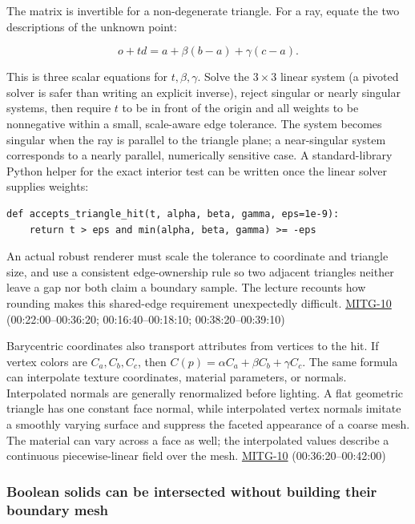 The matrix is invertible for a non-degenerate triangle. For a ray, equate the two descriptions of the unknown point:

\[
o+td=a+\beta(b-a)+\gamma(c-a).
\]

This is three scalar equations for \(t,\beta,\gamma\). Solve the \(3\times3\) linear system (a pivoted solver is safer than writing an explicit inverse), reject singular or nearly singular systems, then require \(t\) to be in front of the origin and all weights to be nonnegative within a small, scale-aware edge tolerance. The system becomes singular when the ray is parallel to the triangle plane; a near-singular system corresponds to a nearly parallel, numerically sensitive case. A standard-library Python helper for the exact interior test can be written once the linear solver supplies weights:

\begin{verbatim}
def accepts_triangle_hit(t, alpha, beta, gamma, eps=1e-9):
    return t > eps and min(alpha, beta, gamma) >= -eps
\end{verbatim}

An actual robust renderer must scale the tolerance to coordinate and triangle size, and use a consistent edge-ownership rule so two adjacent triangles neither leave a gap nor both claim a boundary sample. The lecture recounts how rounding makes this shared-edge requirement unexpectedly difficult. \hyperref[04-visual-computing-ii-ch036]{MITG-10} (00:22:00--00:36:20; 00:16:40--00:18:10; 00:38:20--00:39:10)

Barycentric coordinates also transport attributes from vertices to the hit. If vertex colors are \(C_a,C_b,C_c\), then \(C(p)=\alpha C_a+\beta C_b+\gamma C_c\). The same formula can interpolate texture coordinates, material parameters, or normals. Interpolated normals are generally renormalized before lighting. A flat geometric triangle has one constant face normal, while interpolated vertex normals imitate a smoothly varying surface and suppress the faceted appearance of a coarse mesh. The material can vary across a face as well; the interpolated values describe a continuous piecewise-linear field over the mesh. \hyperref[04-visual-computing-ii-ch036]{MITG-10} (00:36:20--00:42:00)

\subsubsection{Boolean solids can be intersected without building their boundary mesh}\label{boolean-solids-can-be-intersected-without-building-their-boundary-mesh}

